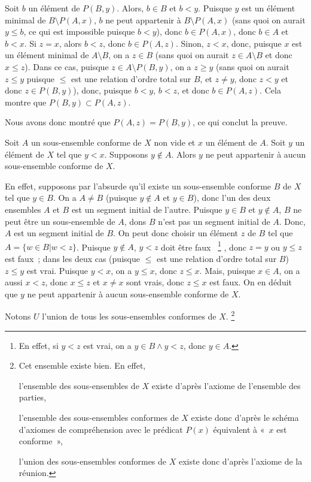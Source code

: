     Soit $b$ un élément de $P(B,y)$. 
    Alors, $b \in B$ et $b < y$.
    Puisque $y$ est un élément minimal de $B \setminus P(A,x)$, $b$ ne peut appartenir à $B \setminus P(A,x)$ (sans quoi on aurait $y \leq b$, ce qui est impossible puisque $b < y$), donc $b \in P(A,x)$, donc $b \in A$ et $b < x$.
    Si $z = x$, alors $b < z$, donc $b \in P(A, z)$.
    Sinon, $z < x$, donc, puisque $x$ est un élément minimal de $A \setminus B$, on a $z \in B$ (sans quoi on aurait $z \in A \setminus B$ et donc $x \leq z$). 
    Dans ce cas, puisque $z \in A \setminus P(B, y)$, on a $z \geq y$ (sans quoi on aurait $z \leq y$ puisque $\leq$ est une relation d'ordre total sur $B$, et $z \neq y$, donc $z < y$ et donc $z \in P(B,y)$), donc, puisque $b < y$, $b < z$, et donc $b \in P(A, z)$.
    Cela montre que $P(B, y) \subset P(A, z)$.

    Nous avons donc montré que $P(A, z) = P(B, y)$, ce qui conclut la preuve.

    \done

\blank[medium]

Soit $A$ un sous-ensemble conforme de $X$ non vide et $x$ un élément de $A$. 
Soit $y$ un élément de $X$ tel que $y < x$. 
Supposons $y \notin A$. 
Alors $y$ ne peut appartenir à aucun sous-ensemble conforme de $X$. 

En effet, supposons par l'absurde qu'il existe un sous-ensemble conforme $B$ de $X$ tel que $y \in B$. 
On a $A \neq B$ (puisque $y \notin A$ et $y \in B$), donc l'un des deux ensembles $A$ et $B$ est un segment initial de l'autre.
Puisque $y \in B$ et $y \notin A$, $B$ ne peut être un sous-ensemble de $A$, dons $B$ n'est pas un segment initial de $A$. 
Donc, $A$ est un segment initial de $B$. 
On peut donc choisir un élément $z$ de $B$ tel que $A = \lbrace w \in B \vert w < z \rbrace$. 
Puisque $y \notin A$, $y < z$ doit être faux%
~\footnote{En effet, si $y < z$ est vrai, on a $y \in B \wedge y < z$, donc $y \in A$.}%
, donc $z = y$ ou $y \leq z$ est faux ; dans les deux cas (puisque $\leq$ est une relation d'ordre total sur $B$) $z \leq y$ est vrai. 
Puisque $y < x$, on a $y \leq x$, donc $z \leq x$. 
Mais, puisque $x \in A$, on a aussi $x < z$, donc $x \leq z$ et $x \neq x$ sont vrais, donc $z \leq x$ est faux. 
On en déduit que $y$ ne peut appartenir à aucun sous-ensemble conforme de $X$. 

Notons $U$ l'union de tous les sous-ensembles conformes de $X$.%
\footnote{
    Cet ensemble existe bien. 
    En effet, 
    \startitemize[nowhite]
        \item l'ensemble des sous-ensembles de $X$ existe d'après l'axiome de l'ensemble des parties, 
        \item l'ensemble des sous-ensembles conformes de $X$ existe donc d'après le schéma d'axiomes de compréhension avec le prédicat $P(x)$ équivalent à « $x$ est conforme », 
        \item l'union des sous-ensembles conformes de $X$ existe donc d'après l'axiome de la réunion.
    \stopitemize}

